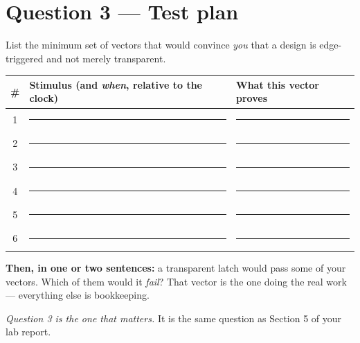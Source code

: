 \documentclass[11pt]{article}
\newcommand{\answerbox}[1]{\vspace{2pt}\fbox{\parbox[c][#1][c]{\dimexpr\linewidth-2\fboxsep-2\fboxrule}{\ }}\vspace{4pt}}
\begin{document}
\answerbox{3.0cm}

\section*{Question 3 --- Test plan}

List the minimum set of vectors that would convince \emph{you} that a design is
edge-triggered and not merely transparent.

\begin{center}
\begin{tabular}{@{}c@{\hskip 8pt}p{5.2cm}@{\hskip 8pt}p{7.4cm}@{}}
\toprule
\# & Stimulus (and \emph{when}, relative to the clock) & What this vector proves \\
\midrule
1 & \rule{5cm}{0.4pt} & \rule{7.2cm}{0.4pt} \\[8pt]
2 & \rule{5cm}{0.4pt} & \rule{7.2cm}{0.4pt} \\[8pt]
3 & \rule{5cm}{0.4pt} & \rule{7.2cm}{0.4pt} \\[8pt]
4 & \rule{5cm}{0.4pt} & \rule{7.2cm}{0.4pt} \\[8pt]
5 & \rule{5cm}{0.4pt} & \rule{7.2cm}{0.4pt} \\[8pt]
6 & \rule{5cm}{0.4pt} & \rule{7.2cm}{0.4pt} \\
\bottomrule
\end{tabular}
\end{center}

\textbf{Then, in one or two sentences:} a transparent latch would pass some of
your vectors. Which of them would it \emph{fail}? That vector is the one doing
the real work --- everything else is bookkeeping.

\answerbox{2.2cm}

\vfill
{\small\emph{Question 3 is the one that matters.} It is the same question as
Section 5 of your lab report.}
\end{document}
